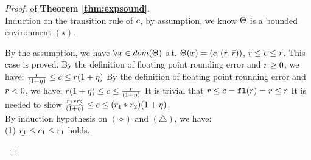 \documentclass[a4paper,11pt]{article}
\begin{document}
\begin{proof} of \textbf{Theorem \ref{thm:expsound}}.
%
\\
%
Induction on the transition rule of $e$, by assumption, we know $\Theta$ is a bounded environment $(\star)$.
%
	\begin{itemize}
%
	\caseL{
	\[\inferrule*[right = var]
		{
			\trsenv(\varx) 
			= (\fval, ( \ubar{\rval}, \bar{\rval} ))
		}
		{
			\trsenv, \varx
			\trsto
			(\fval, ( \ubar{\rval}, \bar{\rval} ))
		}\]
		}
	By the assumption, we have $\forall x \in dom(\Theta)$ s.t. $\trsenv(\varx) = (\fval, (\ubar{\rval}, \bar{\rval}))$, 
	$\ubar{\rval} \leq \fval \leq \bar{\rval}$.
	This case is proved.
	\caseL{
	\[\inferrule*[right = val]
		{
			\fval = \floaten(\rval)
			\and
			\fval \neq \rval
			\and
			\rval \geq 0
		}
		{
			\trsenv, \rval
			\trsto
			\big(\fval, 
			(\frac{\rval}{(1 + \eta)}, \rval(1 + \eta)) 
			\big)
		}
		\]
	}
	By the definition of floating point rounding error and $r \geq 0$, we have:
	$\frac{r}{(1 + \eta)}
	\leq c \leq
	r(1 + \eta)$
	\caseL{\[
	\inferrule*[right = val-neg]
	{
		\fval = \floaten(\rval) 
		\and
		\fval \neq \rval
		\and
		\rval < 0
	}
	{
		\trsenv, \rval
		\trsto
		\big(\fval, (\rval(1 + \eta), \frac{\rval}{(1 + \eta)}) \big)
	}
	\]}
	By the definition of floating point rounding error and $r < 0$, we have:
	$r(1 + \eta)
	\leq c \leq
	\frac{r}{(1 + \eta)}$
	\caseL{\[
		\inferrule*[right = val-eq]
		{
			\fval = \floaten(\rval)
			~~~~
			\fval = \rval
		}
		{
			\trsenv, \rval
			\trsto
			(\fval, (\rval, \rval) )
		}
	\]}
	It is trivial that $r \leq c = \mathtt{fl}(r) = r \leq r$
	\caseL{\[
	\inferrule*[right = bop-pp]
	{
		\trsenv, \expr_1 \trsto (\fval_1, (\ubar{\rval_1}, \bar{\rval_1})) ~ (\diamond)
		~~~
		\trsenv, \expr_2 \trsto (\fval_2, (\ubar{\rval_2}, \bar{\rval_2})) ~ (\triangle)
		~~~
		\fval_1 \geq 0
		~~~
		\fval_2 \geq 0
		~~~
		\fval = \floaten(\fval_1 * \fval_2)
		~~~
		* \in \{\times, \div \}
	}
	{
	    \trsenv, \expr_1 * \expr_2
	    \trsto
	    \big(
	    \fval,
	    (\frac{\ubar{\rval_1} * \ubar{\rval_2}}{(1 + \eta)}, 
	    (\bar{\rval_1} * \bar{\rval_2})(1 + \eta))
	    \big)
	}
	\]}
	It is needed to show $\frac{\ubar{\rval_1} * \ubar{\rval_2}}{(1 + \eta)}
	\leq \fval \leq 
	(\bar{\rval_1} * \bar{\rval_2})(1 + \eta)$.\\
	By induction hypothesis on $(\diamond)$ and $(\triangle)$, we have:\\
	(1) $\ubar{\rval_1} \leq \fval_1 \leq \bar{\rval_1}$ holds. 

\end{itemize}
\end{proof}
\end{document}
